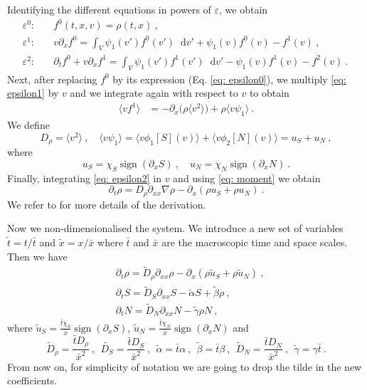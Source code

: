 \documentclass[11pt,twoside]{article}
\DeclareMathOperator{\sign}{sign}
\newcommand*\diff{\mathop{}\!\mathrm{d}}
\begin{document}
\noindent Identifying the different equations in powers of $\varepsilon$, we obtain
\fi
\begin{align}
    \varepsilon^0: & \quad f^0(t,{x},{v})=\rho(t,{x})\ ,\label{eq: epsilon0}\\
    \varepsilon^1: & \quad {v}\partial_x f^0=\int_V\psi_1(v')f^0(v')\diff v'{+}\psi_1(v)f^0(v)-f^1(v)\ ,\label{eq: epsilon1}\\
    \varepsilon^2: & \quad \partial_tf^0+{v}\partial_x f^1 =\int_V\psi_1(v')f^1(v')\diff v'-\psi_1(v)f^1(v)-f^2(v) \ \label{eq: epsilon2}.\
\end{align}
Next, after replacing $f^0$ by its expression (Eq. \eqref{eq: epsilon0}), we multiply \eqref{eq: epsilon1} by ${v}$ and we integrate again with respect to ${v}$ to obtain
\begin{align}
    \langle{v}f^1\rangle&=- \partial_x \big(\rho  \langle v^2\rangle \big)+\rho \langle {v}\psi_1\rangle  \ .\label{eq: mean direction}
\end{align}
We define
\begin{equation}
D_\rho=\langle v^2 \rangle\ ,\quad \langle {v}\psi_1\rangle=\langle{v}\phi_1[S]({v})\rangle+\langle{v}\phi_2[N]({v})\rangle=u_S+ u_N\ ,\label{eq: moment}\end{equation} 
where 
\begin{equation}
u_S= \chi_S\sign(\partial_x S)\ , \quad u_N=\chi_N \sign(\partial_x N)\ .
\end{equation}
Finally, integrating \eqref{eq: epsilon2} in ${v}$ and using \eqref{eq: moment} we obtain
\[
\partial_t\rho=D_\rho\partial_{xx}\nabla\rho-\partial_x(\rho u_S+\rho u_N)\ .
\]
We refer to \cite{emako2015existence,emako2016traveling} for more details of the derivation.


Now we non-dimensionalised the system. We introduce a new set of variables $\tilde{t}=t/\bar{t}$ and $\tilde{x}=x/\bar{x}$ where $\bar{t}$ and $\bar{x}$ are the macroscopic time and space scales. Then we have
\begin{align}
&\partial_t\rho =\tilde{D}_\rho\partial_{xx}\rho-\partial_x (\rho \tilde{u}_S+\rho \tilde{u}_N)\ ,\label{eq: rho nondimension}\\
&\partial_tS =\tilde{D}_S\partial_{xx} S-\tilde{\alpha} S+\tilde{\beta} \rho\ ,\\
&\partial_t N=\tilde{D}_N\partial_{xx} N-\tilde{\gamma} \rho N\ \label{eq: N nondimension},
\end{align}
where $\tilde{u}_S=\frac{\bar{t}\chi_S}{\bar{x}}\sign(\partial_x S)$, $\tilde{u}_N=\frac{\bar{t}\chi_N}{\bar{x}}\sign(\partial_x N)$ and 
\[
\tilde{D}_\rho=\frac{\bar{t}D_\rho}{\bar{x}^2}\ ,\ \ \tilde{D_S}=\frac{\bar{t}D_S}{\bar{x}^2}\ ,\ \ \tilde{\alpha}=\bar{t}\alpha\ ,\ \ \tilde{\beta}=\bar{t}\beta\ ,\ \ \tilde{D}_N=\frac{\bar{t}D_N}{\bar{x}^2}\ ,\ \ \tilde{\gamma}=\gamma \bar{t}\ .
\]
From now on, for simplicity of notation we are going to drop the tilde in the new coefficients.
\end{document}
